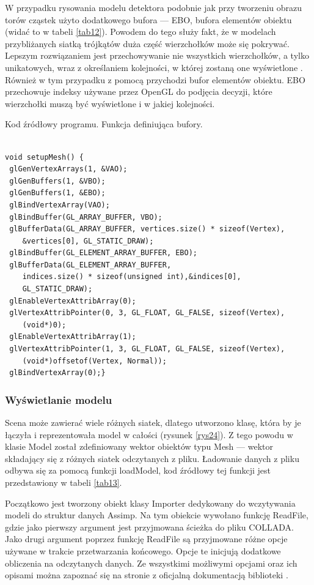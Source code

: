 W przypadku rysowania modelu detektora podobnie jak przy tworzeniu obrazu torów cząstek użyto dodatkowego bufora --- EBO, bufora elementów obiektu (widać to w tabeli \ref{tab12}). Powodem do tego służy fakt, że w modelach przybliżanych siatką trójkątów duża część wierzchołków może się pokrywać. Lepszym rozwiązaniem jest przechowywanie nie wszystkich wierzchołków, a tylko unikatowych, wraz z określaniem kolejności, w której zostaną one wyświetlone \cite{learnopengl}. Również w tym przypadku z pomocą przychodzi bufor elementów obiektu. EBO przechowuje indeksy używane przez OpenGL do podjęcia decyzji, które wierzchołki muszą być wyświetlone i w jakiej kolejności.

\begin{table}[H]
\caption{Kod źródłowy programu. Funkcja definiująca bufory.}
\label{tab12}
\begin{lstlisting}[frame=single]  % Start your code-block

void setupMesh() {
 glGenVertexArrays(1, &VAO);
 glGenBuffers(1, &VBO);
 glGenBuffers(1, &EBO);
 glBindVertexArray(VAO);
 glBindBuffer(GL_ARRAY_BUFFER, VBO);
 glBufferData(GL_ARRAY_BUFFER, vertices.size() * sizeof(Vertex), 
 	&vertices[0], GL_STATIC_DRAW);
 glBindBuffer(GL_ELEMENT_ARRAY_BUFFER, EBO);
 glBufferData(GL_ELEMENT_ARRAY_BUFFER, 
 	indices.size() * sizeof(unsigned int),&indices[0], 
 	GL_STATIC_DRAW);
 glEnableVertexAttribArray(0);
 glVertexAttribPointer(0, 3, GL_FLOAT, GL_FALSE, sizeof(Vertex), 
 	(void*)0);
 glEnableVertexAttribArray(1);
 glVertexAttribPointer(1, 3, GL_FLOAT, GL_FALSE, sizeof(Vertex),
 	(void*)offsetof(Vertex, Normal));
 glBindVertexArray(0);}
\end{lstlisting}
\end{table}

\subsubsection{Wyświetlanie modelu}
Scena może zawierać wiele różnych siatek, dlatego utworzono klasę, która by je łączyła i reprezentowała model w całości (rysunek \ref{rys24}). Z tego powodu w klasie Model został zdefiniowany wektor obiektów typu Mesh --- wektor składający się z różnych siatek odczytanych z pliku. Ładowanie danych z pliku odbywa się za pomocą funkcji loadModel, kod źródłowy tej funkcji jest przedstawiony w tabeli \ref{tab13}.

Początkowo jest tworzony obiekt klasy Importer dedykowany do wczytywania modeli do struktur danych Assimp. Na tym obiekcie wywołano funkcję ReadFile, gdzie jako pierwszy argument jest przyjmowana ścieżka do pliku COLLADA. Jako drugi argument poprzez funkcję ReadFile są przyjmowane różne opcje używane w trakcie przetwarzania końcowego. Opcje te inicjują dodatkowe obliczenia na odczytanych danych. Ze wszystkimi możliwymi opcjami oraz ich opisami można zapoznać się na stronie z oficjalną dokumentacją biblioteki \cite{assimpDocumentation}.

